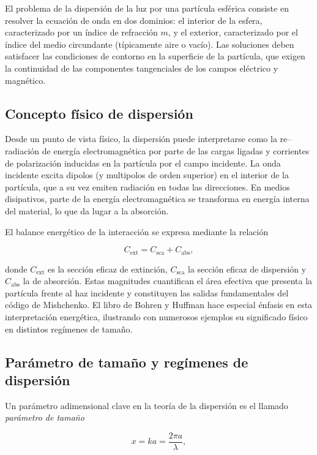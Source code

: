 \documentclass[12pt,a4paper]{article}
\begin{document}
El problema de la dispersión de la luz por una partícula esférica consiste en resolver la ecuación de onda en dos dominios: el interior de la esfera, caracterizado por un índice
de refracción $m$, y el exterior, caracterizado por el índice del medio circundante (típicamente aire o vacío).
Las soluciones deben satisfacer las condiciones de contorno en la superficie de la partícula, que exigen la continuidad de las componentes tangenciales de los campos eléctrico y magnético.

\subsection{Concepto físico de dispersión}

Desde un punto de vista físico, la dispersión puede interpretarse como la re--radiación de energía electromagnética por parte de las cargas ligadas y corrientes de polarización inducidas
en la partícula por el campo incidente.
La onda incidente excita dipolos (y multipolos de orden superior) en el interior de la partícula, que a su vez emiten radiación en todas las direcciones.
En medios disipativos, parte de la energía electromagnética se transforma en energía interna del material, lo que da lugar a la absorción.

El balance energético de la interacción se expresa mediante la relación

\begin{equation}
  C_{\text{ext}} = C_{\text{sca}} + C_{\text{abs}},
\end{equation}

donde $C_{\text{ext}}$ es la sección eficaz de extinción, $C_{\text{sca}}$ la sección eficaz de dispersión y $C_{\text{abs}}$ la de absorción.
Estas magnitudes cuantifican el área efectiva que presenta la partícula frente al haz incidente y constituyen las salidas fundamentales del código de Mishchenko.
El libro de Bohren y Huffman hace especial énfasis en esta interpretación energética, ilustrando con numerosos ejemplos su significado físico en distintos regímenes de tamaño.

\subsection{Parámetro de tamaño y regímenes de dispersión}

Un parámetro adimensional clave en la teoría de la dispersión es el llamado \emph{parámetro de tamaño}

\begin{equation}
  x = k a = \frac{2\pi a}{\lambda},
\end{equation}
\end{document}
